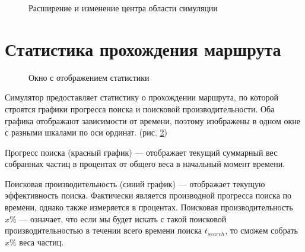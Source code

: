 \begin{figure}[ht]
  \centering
    \caption{Расширение и изменение центра области симуляции}
    \label{corr:5}
\end{figure}

\section{Статистика прохождения маршрута}
\begin{figure}[ht]
  \centering
    \caption{Окно с отображением статистики}
    \label{stat:0}
\end{figure}

Симулятор предоставляет статистику о прохождении маршрута, по которой строятся графики
прогресса поиска и поисковой производительности. Оба графика отображают зависимости
от времени, поэтому изображены в одном окне с разными шкалами по оси ординат. (рис. \ref{stat:0})

Прогресс поиска (красный график) --- отображает текущий суммарный вес собранных частиц
в процентах от общего веса в начальный момент времени.

Поисковая производительность (синий график) --- отображает текущую эффективность поиска.
Фактически является производной прогресса поиска по времени, однако также измеряется
в процентах. Поисковая производительность $x\%$ --- означает, что если мы будет искать
с такой поисковой производительностью в течении всего времени поиска $t_{search}$,
то сможем собрать $x\%$ веса частиц. 

\FloatBarrier
